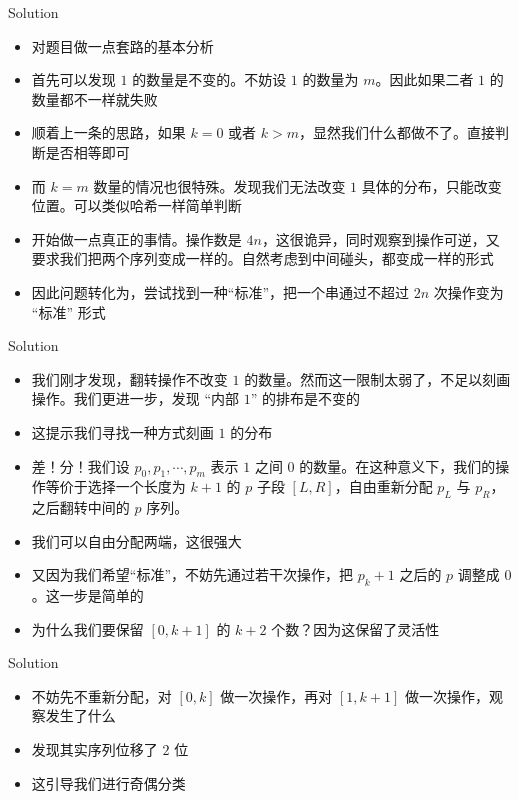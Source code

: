 ﻿\documentclass[aspectratio=169]{ctexbeamer}
\begin{document}
\begin{frame}{Solution}
    \begin{itemize}
        \item 对题目做一点套路的基本分析
        \item 首先可以发现 $ 1 $ 的数量是不变的。不妨设 $ 1 $ 的数量为 $ m $。因此如果二者 $ 1 $ 的数量都不一样就失败
        \item 顺着上一条的思路，如果 $k=0$ 或者 $k>m$，显然我们什么都做不了。直接判断是否相等即可
        \item 而 $k=m$ 数量的情况也很特殊。发现我们无法改变 $ 1 $ 具体的分布，只能改变位置。可以类似哈希一样简单判断
        \item 开始做一点真正的事情。操作数是 $4n$，这很诡异，同时观察到操作可逆，又要求我们把两个序列变成一样的。自然考虑到中间碰头，都变成一样的形式
        \item 因此问题转化为，尝试找到一种“标准”，把一个串通过不超过 $2n$ 次操作变为 “标准” 形式
    \end{itemize}
\end{frame}

\begin{frame}{Solution}
    \begin{itemize}
        \item 我们刚才发现，翻转操作不改变 $ 1 $ 的数量。然而这一限制太弱了，不足以刻画操作。我们更进一步，发现 “内部 $ 1 $” 的排布是不变的
        \item 这提示我们寻找一种方式刻画 $ 1 $ 的分布
        \item 差！分！我们设 $p_0,p_1,\cdots,p_m$ 表示 $ 1 $ 之间 $ 0 $ 的数量。在这种意义下，我们的操作等价于选择一个长度为 $k+1$ 的 $p$ 子段 $[L,R]$，自由重新分配 $p_L$ 与 $p_R$，之后翻转中间的 $p$ 序列。
        \item 我们可以自由分配两端，这很强大
        \item 又因为我们希望“标准”，不妨先通过若干次操作，把 $p_k+1$ 之后的 $p$ 调整成 $ 0 $。这一步是简单的
        \item 为什么我们要保留 $[0,k+1]$ 的 $k+2$ 个数？因为这保留了灵活性
    \end{itemize}
\end{frame}

\begin{frame}{Solution}
    \begin{itemize}
        \item 不妨先不重新分配，对 $[0,k]$ 做一次操作，再对 $[1,k+1]$ 做一次操作，观察发生了什么
        \item 发现其实序列位移了 $ 2 $ 位
        \item 这引导我们进行奇偶分类
    \end{itemize}
\end{frame}
\end{document}
